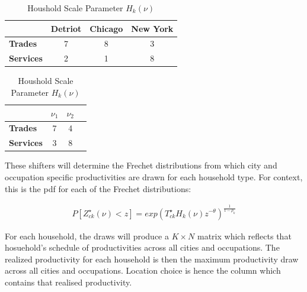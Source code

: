 \documentclass[10pt]{article}
\begin{document}
\vspace{2em}

\begin{table}[h]
    \begin{minipage}{0.5\textwidth}
        \centering
        \begin{tabular}{|l|c|c|c|}
            \hline
                              & \textbf{Detriot} & \textbf{Chicago} & \textbf{New York} \\
            \hline
            \textbf{Trades}   & 7                & 8                & 3                 \\
            \hline
            \textbf{Services} & 2                & 1                & 8                 \\
            \hline
        \end{tabular}
        \caption{City Scale Parameters $T_{ck}^{\star}$}
        \label{city_shifter}
    \end{minipage}%
    \begin{minipage}{0.5\textwidth}
        \centering
        \begin{tabular}{|l|c|c|c|}
            \hline
                              & \textbf{$\nu_1$} & \textbf{$\nu_2$} \\
            \hline
            \textbf{Trades}   & 7                & 4                \\
            \hline
            \textbf{Services} & 3                & 8                \\
            \hline
        \end{tabular}
        \caption{Houshold Scale Parameter $H_k(\nu)$}
        \label{household_shifter}
    \end{minipage}
\end{table}

\vspace{2em}

These shifters will determine the Frechet distributions from which city and occupation specific productivities are drawn for each household type. For context, this is the pdf for each of the Frechet distributions:

\begin{align}
    P[Z_{ck}^{\star}(\nu) < z] = exp(T_{ck}^{\star} H_k(\nu) z^{-\theta})^{\frac{1}{1 - \rho_k}}
\end{align}

For each household, the draws will produce a $K \times N$ matrix which reflects that hosuehold's schedule of productivities across all cities and occupations. The realized productivity for each household is then the maximum productivity draw across all cities and occupations. Location choice is hence the column which contains that realised productivity.
\end{document}
